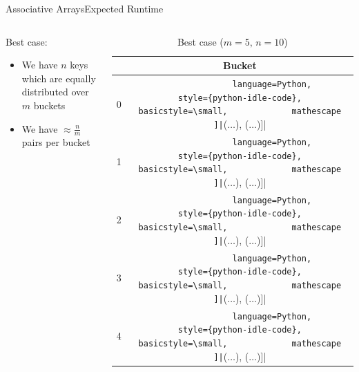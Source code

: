 \begin{frame}{Associative Arrays}{Expected Runtime}
  \begin{columns}
    \begin{column}{0.6\linewidth}
      {\color{Mittel-Blau}Best case}:
      \begin{itemize}
        \item
          We have {\color{Mittel-Blau}$n$} keys which are equally distributed over {\color{Mittel-Blau}$m$} buckets
        \item
          We have {\color{Mittel-Blau}$\approx \frac{n}{m}$} pairs per bucket
      \end{itemize}
    \end{column}
    \begin{column}{0.3\linewidth}
      \begin{table}[!h]
        \caption{Best case ($m = 5, \, n = 10$)}
        \label{tab:hash_table:runtime_best_case}
        \begin{tabularx}{\textwidth}{c|c}
          {} & Bucket\\
          \midrule
          0 & \lstinline[
            language=Python,
            style={python-idle-code},
            basicstyle=\small,
            mathescape
          ]|[($\ldots$), ($\ldots$)]|\\
          1 & \lstinline[
            language=Python,
            style={python-idle-code},
            basicstyle=\small,
            mathescape
          ]|[($\ldots$), ($\ldots$)]|\\
          2 & \lstinline[
            language=Python,
            style={python-idle-code},
            basicstyle=\small,
            mathescape
          ]|[($\ldots$), ($\ldots$)]|\\
          3 & \lstinline[
            language=Python,
            style={python-idle-code},
            basicstyle=\small,
            mathescape
          ]|[($\ldots$), ($\ldots$)]|\\
          4 & \lstinline[
            language=Python,
            style={python-idle-code},
            basicstyle=\small,
            mathescape
          ]|[($\ldots$), ($\ldots$)]|
        \end{tabularx}
      \end{table}
    \end{column}
  \end{columns}
\end{frame}

